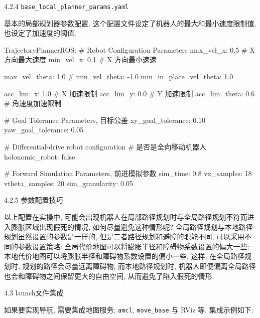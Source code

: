 \documentclass[openany, fontset=windowsold]{ctexbook}
\theoremstyle{kaiti}
\theoremstyle{normal}
\begin{document}
4.2.4 \verb|base_local_planner_params.yaml|

基本的局部规划器参数配置, 这个配置文件设定了机器人的最大和最小速度限制值, 也设定了加速度的阈值.

\begin{bash}
  TrajectoryPlannerROS:
  # Robot Configuration Parameters
    max_vel_x: 0.5 # X 方向最大速度
    min_vel_x: 0.1 # X 方向最小速速

    max_vel_theta:  1.0 # 
    min_vel_theta: -1.0
    min_in_place_vel_theta: 1.0

    acc_lim_x: 1.0 # X 加速限制
    acc_lim_y: 0.0 # Y 加速限制
    acc_lim_theta: 0.6 # 角速度加速限制

  # Goal Tolerance Parameters, 目标公差
    xy_goal_tolerance: 0.10
    yaw_goal_tolerance: 0.05

  # Differential-drive robot configuration
  # 是否是全向移动机器人
    holonomic_robot: false

  # Forward Simulation Parameters, 前进模拟参数
    sim_time: 0.8
    vx_samples: 18
    vtheta_samples: 20
    sim_granularity: 0.05
\end{bash}

4.2.5 参数配置技巧

以上配置在实操中, 可能会出现机器人在局部路径规划时与全局路径规划不符而进入膨胀区域出现假死的情况, 如何尽量避免这种情形呢? 全局路径规划与本地路径规划虽然设置的参数是一样的, 但是二者路径规划和避障的职能不同, 可以采用不同的参数设置策略: 全局代价地图可以将膨胀半径和障碍物系数设置的偏大一些; 本地代价地图可以将膨胀半径和障碍物系数设置的偏小一些. 这样, 在全局路径规划时, 规划的路径会尽量远离障碍物, 而本地路径规划时, 机器人即便偏离全局路径也会和障碍物之间保留更大的自由空间, 从而避免了陷入假死的情形.

4.3 launch文件集成

如果要实现导航, 需要集成地图服务, \verb|amcl|, \verb|move_base| 与 RViz 等, 集成示例如下:

\end{document}
